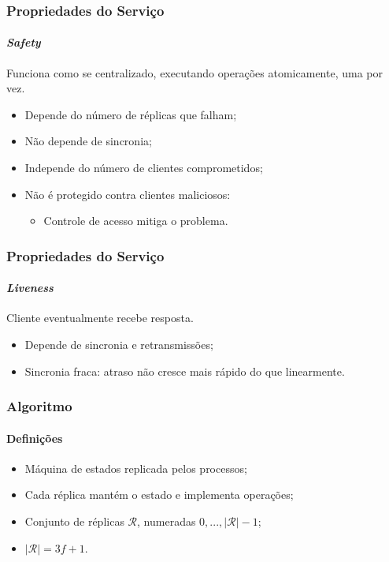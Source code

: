 \documentclass{beamer}
\begin{document}
\begin{frame}
  \frametitle{Propriedades do Serviço}
  \framesubtitle{\textit{Safety}}

  Funciona como se centralizado, executando operações atomicamente, uma por vez.
  \begin{itemize}
      \pause
    \item
      Depende do número de réplicas que falham;

      \pause
    \item
      Não depende de sincronia;

      \pause
    \item
      Independe do número de clientes comprometidos;

      \pause
    \item
      Não é protegido contra clientes maliciosos:
      \pause
      \begin{itemize}
        \item
          Controle de acesso mitiga o problema.
      \end{itemize}
  \end{itemize}
\end{frame}

\begin{frame}
  \frametitle{Propriedades do Serviço}
  \framesubtitle{\textit{Liveness}}

  Cliente eventualmente recebe resposta.
  \begin{itemize}
      \pause
    \item
      Depende de sincronia e retransmissões;
      
      \pause
    \item
      Sincronia fraca: atraso não cresce mais rápido do que linearmente.
  \end{itemize}
\end{frame}

\begin{frame}
  \frametitle{Algoritmo}
  \framesubtitle{Definições}

  \begin{itemize}
    \item
      Máquina de estados replicada pelos processos;

      \pause
    \item
      Cada réplica mantém o estado e implementa operações;

      \pause
    \item
      Conjunto de réplicas $\mathcal{R}$, numeradas $0, ..., |\mathcal{R}| - 1$;

      \pause
    \item
      $|\mathcal{R}| = 3f + 1$.
  \end{itemize}
\end{frame}
\end{document}
